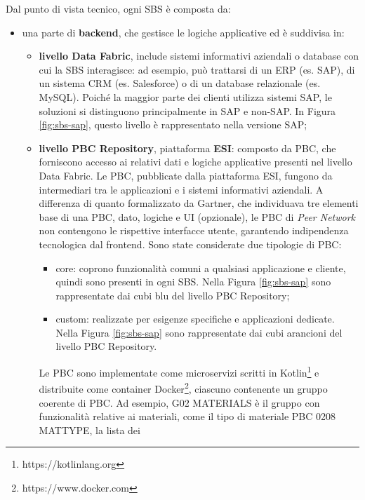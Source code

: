 Dal punto di vista tecnico, ogni \ac{SBS} è composta da:
\begin{itemize}
    \item una parte di \textbf{backend}, che gestisce le logiche applicative ed è suddivisa in:
        \begin{itemize}
            \item \textbf{livello Data Fabric}, include sistemi informativi aziendali o database con cui la
            \ac{SBS} interagisce: ad esempio, può trattarsi di un \ac{ERP} (es. SAP), di un sistema \ac{CRM}
            (es. Salesforce) o di un database relazionale (es. MySQL). Poiché la maggior parte
            dei clienti utilizza sistemi SAP, le soluzioni si distinguono principalmente in SAP e non-SAP. In Figura
            \ref{fig:sbs-sap}, questo livello è rappresentato nella versione SAP;
            \item \textbf{livello \ac{PBC} Repository}, piattaforma \textbf{\ac{ESI}}: composto da \ac{PBC}, che forniscono accesso
            ai relativi dati e logiche applicative presenti nel livello Data Fabric. Le \ac{PBC}, pubblicate
            dalla piattaforma \ac{ESI}, fungono da intermediari tra le applicazioni e i sistemi informativi aziendali.
            A differenza di quanto formalizzato da Gartner, che individuava tre
            elementi base di una \ac{PBC}, dato, logiche e UI (opzionale), le \ac{PBC} di \textit{Peer Network} non contengono
            le rispettive interfacce utente, garantendo indipendenza tecnologica dal frontend. Sono state
            considerate due tipologie di \ac{PBC}:
            \begin{itemize}
                \item core: coprono funzionalità comuni a qualsiasi applicazione e cliente, quindi
                sono presenti in ogni \ac{SBS}. Nella Figura \ref{fig:sbs-sap} sono rappresentate dai cubi blu
                del livello PBC Repository;
                \item custom: realizzate per esigenze specifiche e applicazioni dedicate. Nella Figura \ref{fig:sbs-sap} sono rappresentate dai cubi
                arancioni del livello PBC Repository.
            \end{itemize}
            Le \ac{PBC} sono implementate come microservizi scritti in Kotlin\footnote{https://kotlinlang.org} e distribuite come container
            Docker\footnote{https://www.docker.com}, ciascuno contenente un gruppo coerente di \ac{PBC}. Ad esempio, G02 MATERIALS è il gruppo con
            funzionalità relative ai materiali, come il tipo di materiale PBC 0208 MATTYPE, la lista dei

\end{itemize}
\end{itemize}
